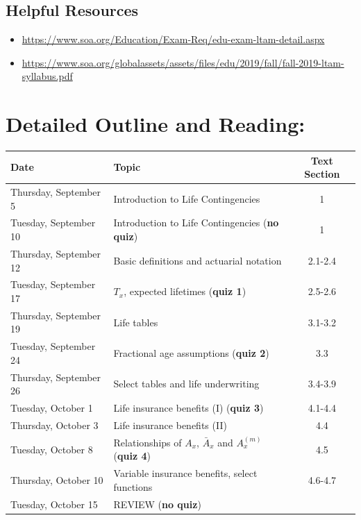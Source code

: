 \documentclass[11pt,fleqn,oneside]{book}
\begin{document}
\subsection*{Helpful Resources}
\begin{itemize}
\item \url{https://www.soa.org/Education/Exam-Req/edu-exam-ltam-detail.aspx}
\item \url{https://www.soa.org/globalassets/assets/files/edu/2019/fall/fall-2019-ltam-syllabus.pdf}
\end{itemize}


\section*{Detailed Outline and Reading:}

\small
\begin{center}
\begin{tabular}{|| l | l | c ||}
\hline
\hline 
\textbf{Date}     	 			& \textbf{Topic}											&	\textbf{Text Section}\\
\hline
\hline
Thursday, September 5 		& Introduction to Life Contingencies							& 1 \\
Tuesday, September 10		& Introduction to Life Contingencies	 (\textbf{no quiz})			& 1 \\
Thursday, September 12		& Basic definitions and actuarial notation						& 2.1-2.4 \\	
Tuesday, September 17 		& $T_x$, expected lifetimes (\textbf{quiz 1})  					& 2.5-2.6 \\
Thursday, September 19 		& Life tables 					      						& 3.1-3.2 \\
Tuesday, September 24     	& Fractional age assumptions (\textbf{quiz 2})  		      			& 3.3 \\
Thursday, September 26 		& Select tables and life underwriting    						& 3.4-3.9 \\
Tuesday, October 1			& Life insurance benefits (I) (\textbf{quiz 3}) 		       						& 4.1-4.4 \\
Thursday, October 3 			& Life insurance benefits (II) 								& 4.4 \\
Tuesday, October 8			& Relationships of $A_x$, $\bar{A}_x$ and $A_x^{(m)}$ (\textbf{quiz 4})	& 4.5 \\		
Thursday, October 10 		&  Variable insurance benefits, select functions					& 4.6-4.7 \\ 
Tuesday, October 15			&  REVIEW   (\textbf{no quiz})    							&  \\	

\end{tabular}
\end{center}
\end{document}
